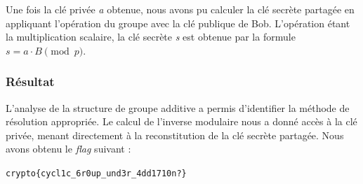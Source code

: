     Une fois la clé privée \textit{a} obtenue, nous avons pu calculer la clé
    secrète partagée en appliquant l'opération du groupe avec la clé publique
    de Bob. L'opération étant la multiplication scalaire, la clé secrète
    \textit{s} est obtenue par la formule $s = a \cdot B \pmod{p}$.

    \subsubsection{Résultat}
    L'analyse de la structure de groupe additive a permis d'identifier la
    méthode de résolution appropriée. Le calcul de l'inverse modulaire nous a
    donné accès à la clé privée, menant directement à la reconstitution de la
    clé secrète partagée. Nous avons obtenu le \textit{flag} suivant :

    \begin{center}
        \texttt{crypto\{cycl1c\_6r0up\_und3r\_4dd1710n?\}}
    \end{center}
